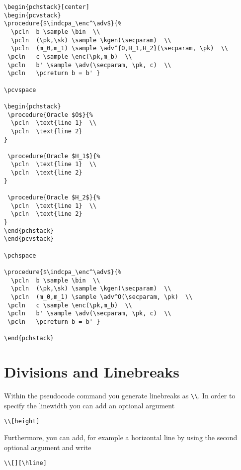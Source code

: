 \documentclass[a4paper]{report}
\begin{document}
\begin{lstlisting}
\begin{pchstack}[center]
\begin{pcvstack}
\procedure{$\indcpa_\enc^\adv$}{%
  \pcln  b \sample \bin  \\
  \pcln  (\pk,\sk) \sample \kgen(\secparam)  \\
  \pcln  (m_0,m_1) \sample \adv^{O,H_1,H_2}(\secparam, \pk)  \\
 \pcln   c \sample \enc(\pk,m_b)  \\
 \pcln   b' \sample \adv(\secparam, \pk, c)  \\
 \pcln   \pcreturn b = b' }

\pcvspace

\begin{pchstack}
 \procedure{Oracle $O$}{%
  \pcln  \text{line 1}  \\
  \pcln  \text{line 2}
}

 \procedure{Oracle $H_1$}{%
  \pcln  \text{line 1}  \\
  \pcln  \text{line 2}
}

 \procedure{Oracle $H_2$}{%
  \pcln  \text{line 1}  \\
  \pcln  \text{line 2}
}
\end{pchstack}
\end{pcvstack}

\pchspace

\procedure{$\indcpa_\enc^\adv$}{%
  \pcln  b \sample \bin  \\
  \pcln  (\pk,\sk) \sample \kgen(\secparam)  \\
  \pcln  (m_0,m_1) \sample \adv^O(\secparam, \pk)  \\
 \pcln   c \sample \enc(\pk,m_b)  \\
 \pcln   b' \sample \adv(\secparam, \pk, c)  \\
 \pcln   \pcreturn b = b' }

\end{pchstack}
\end{lstlisting}

\section{Divisions and Linebreaks}
Within the pseudocode command you generate linebreaks as \lstinline$\\$. In order to specify the linewidth you can add an optional argument
\begin{lstlisting}
\\[height]
\end{lstlisting}
Furthermore, you can add, for example a horizontal line by using the second optional argument and write
\begin{lstlisting}
\\[][\hline]
\end{lstlisting}
\end{document}

